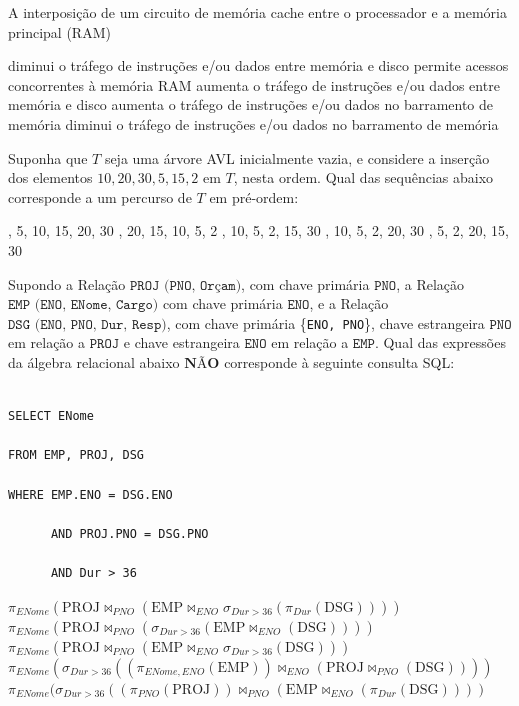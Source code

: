\documentclass[12pt, addpoints]{exam}
\begin{document}
\begin{questions}
\question

A interposição de um circuito de memória cache entre o processador e a memória principal (RAM)
\begin{choices}
\choice diminui o tráfego de instruções e/ou dados entre memória e disco
\choice permite acessos concorrentes à memória RAM
\choice aumenta o tráfego de instruções e/ou dados entre memória e disco
\choice aumenta o tráfego de instruções e/ou dados no barramento de memória
\choice diminui o tráfego de instruções e/ou dados no barramento de memória
\end{choices}

\question

Suponha que \( T \) seja uma árvore AVL inicialmente vazia, e considere a inserção dos elementos \(10, 20, 30, 5, 15, 2\) em \( T \), nesta ordem. Qual das sequências abaixo corresponde a um percurso de \( T \) em pré-ordem:
\begin{choices}
, 5, 10, 15, 20, 30
, 20, 15, 10, 5, 2
, 10, 5, 2, 15, 30
, 10, 5, 2, 20, 30
, 5, 2, 20, 15, 30
\end{choices}

\question

Supondo a Relação $\texttt{PROJ (PNO, Orçam)}$, com chave primária $\texttt{PNO}$, a Relação $\texttt{EMP (ENO, ENome, Cargo)}$ com chave primária $\texttt{ENO}$, e a Relação $\texttt{DSG (ENO, PNO, Dur, Resp)}$, com chave primária \{\texttt{ENO, PNO}\}, chave estrangeira $\texttt{PNO}$ em relação a $\texttt{PROJ}$ e chave estrangeira $\texttt{ENO}$ em relação a $\texttt{EMP}$. Qual das expressões da álgebra relacional abaixo $\textbf{NÃO}$ corresponde à seguinte consulta SQL:



\begin{verbatim}

SELECT ENome

FROM EMP, PROJ, DSG

WHERE EMP.ENO = DSG.ENO

      AND PROJ.PNO = DSG.PNO

      AND Dur > 36

\end{verbatim}
\begin{choices}
\choice \( \pi_{ENome} (\text{PROJ} \Join_{PNO} (\text{EMP} \Join_{ENO} \sigma_{Dur > 36} (\pi_{Dur} (\text{DSG})))) \)
\choice \( \pi_{ENome} (\text{PROJ} \Join_{PNO} (\sigma_{Dur > 36} (\text{EMP} \Join_{ENO} (\text{DSG})))) \)
\choice \( \pi_{ENome} (\text{PROJ} \Join_{PNO} (\text{EMP} \Join_{ENO} \sigma_{Dur > 36} (\text{DSG}))) \)
\choice \( \pi_{ENome} (\sigma_{Dur > 36} ((\pi_{ENome, ENO} (\text{EMP})) \Join_{ENO} (\text{PROJ} \Join_{PNO} (\text{DSG})))) \)
\choice \( \pi_{ENome} (\sigma_{Dur > 36} ((\pi_{PNO} (\text{PROJ})) \Join_{PNO} (\text{EMP} \Join_{ENO} (\pi_{Dur} (\text{DSG})))) \)
\end{choices}


\end{questions}
\end{document}

